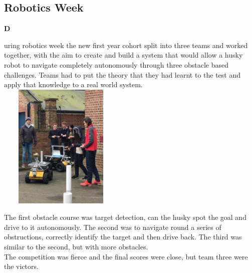 \documentclass[10pt,final]{papertex}
\begin{document}
\begin{frontpage}
\section*{Robotics Week}
\noindent
\begin{multicols}{2}
	\noindent\textbf{D}\large{uring robotics week the new first year cohort split into three teams and worked together, with the aim to create and build a system that would allow a husky robot to navigate completely autonomously through three obstacle based challenges.
	Teams had to put the theory that they had learnt to the test and apply that knowledge to a real world system.\\
	
	\includegraphics[width=6cm,height=6cm,keepaspectratio]{img/robots}
    
    \noindent The first obstacle course was target detection, can the husky spot the goal and drive to it autonomously. The second was to navigate round a series of obstructions, correctly identify the target and then drive back. The third was similar to the second, but with more obstacles.\\
    \noindent The competition was fierce and the final scores were close, but team three were the victors.\\
     
}
\end{multicols}
\end{frontpage}
\end{document}
